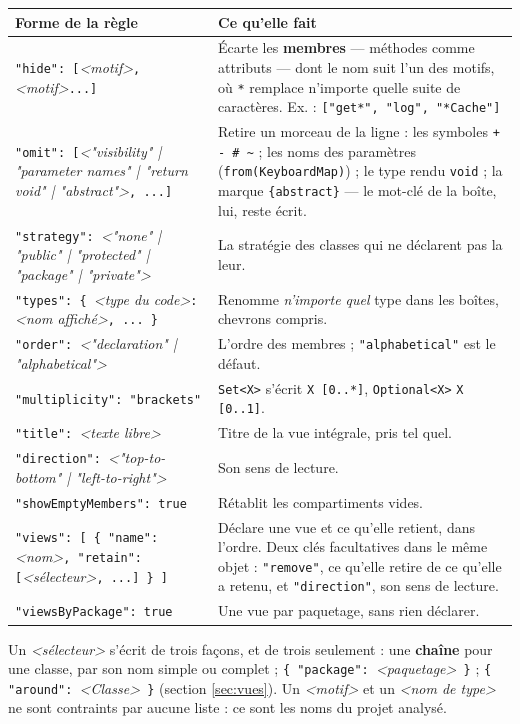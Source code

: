 \documentclass[12pt, a4paper]{article}
\newcommand{\meta}[1]{\textnormal{\textit{<#1>}}}
\begin{document}
\begin{longtable}{@{}L{7.4cm}L{9.2cm}@{}}
\hline
\textbf{Forme de la règle} & \textbf{Ce qu'elle fait} \\
\hline
\endhead
\texttt{"hide": [}\meta{motif}\texttt{, }\meta{motif}\texttt{...]} & Écarte les \textbf{membres} --- méthodes comme attributs --- dont le nom suit l'un des motifs, où \texttt{*} remplace n'importe quelle suite de caractères. Ex. : \texttt{["get*", "log", "*Cache"]} \\
\texttt{"omit": [}\meta{"visibility" | "parameter names" | "return void" | "abstract"}\texttt{, ...]} & Retire un morceau de la ligne : les symboles \texttt{+ - \# \textasciitilde} ; les noms des paramètres (\texttt{from(KeyboardMap)}) ; le type rendu \texttt{void} ; la marque \texttt{\{abstract\}} --- le mot-clé de la boîte, lui, reste écrit. \\
\texttt{"strategy": }\meta{"none" | "public" | "protected" | "package" | "private"} & La stratégie des classes qui ne déclarent pas la leur. \\
\texttt{"types": \{ }\meta{type du code}\texttt{: }\meta{nom affiché}\texttt{, ... \}} & Renomme \textit{n'importe quel} type dans les boîtes, chevrons compris. \\
\texttt{"order": }\meta{"declaration" | "alphabetical"} & L'ordre des membres ; \texttt{"alphabetical"} est le défaut. \\
\texttt{"multiplicity": "brackets"} & \texttt{Set<X>} s'écrit \texttt{X [0..*]}, \texttt{Optional<X>} \texttt{X [0..1]}. \\
\texttt{"title": }\meta{texte libre} & Titre de la vue intégrale, pris tel quel. \\
\texttt{"direction": }\meta{"top-to-bottom" | "left-to-right"} & Son sens de lecture. \\
\texttt{"showEmptyMembers": true} & Rétablit les compartiments vides. \\
\texttt{"views": [ \{ "name": }\meta{nom}\texttt{, "retain": [}\meta{sélecteur}\texttt{, ...] \} ]} & Déclare une vue et ce qu'elle retient, dans l'ordre. Deux clés facultatives dans le même objet : \texttt{"remove"}, ce qu'elle retire de ce qu'elle a retenu, et \texttt{"direction"}, son sens de lecture. \\
\texttt{"viewsByPackage": true} & Une vue par paquetage, sans rien déclarer. \\
\hline
\end{longtable}

\noindent Un \meta{sélecteur} s'écrit de trois façons, et de trois seulement : une \textbf{chaîne} pour une classe, par son nom simple ou complet ; \texttt{\{ "package": }\meta{paquetage}\texttt{ \}} ; \texttt{\{ "around": }\meta{Classe}\texttt{ \}} (section \ref{sec:vues}). Un \meta{motif} et un \meta{nom de type} ne sont contraints par aucune liste : ce sont les noms du projet analysé.
\end{document}
